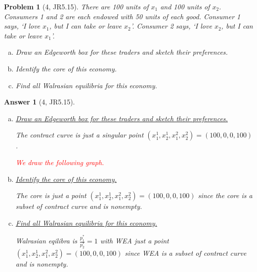 \documentclass{article}
\newtheorem*{ans}{Answer}
\newtheorem*{prob}{{\bf Problem}}
\newcommand{\1}{{\bf 1}}
\newcommand{\0}{{\mathbf{0}}}
\newcommand{\<}{\langle}
\renewcommand{\>}{\rangle}
\begin{document}
\begin{prob}[4, JR5.15]There are 100 units of $x_1$ and 100 units of $x_2$. Consumers 1 and 2 are each endowed with 50 units of each good. Consumer 1 says, ‘I love $x_1$, but I can take or leave $x_2$’. Consumer 2 says, ‘I love $x_2$, but I can take or leave $x_1$’.
\begin{enumerate}[(a)]
	\item Draw an Edgeworth box for these traders and sketch their preferences. 
\item  Identify the core of this economy. \item  Find all Walrasian equilibria for this economy.
\end{enumerate}
\end{prob}
\begin{ans}[4, JR5.15]
	
	\begin{enumerate}[(a)]
		\item \ul{Draw an Edgeworth box for these traders and sketch their preferences.}
		
		The contract curve is just a singular point $\left(x_1^1,x_2^1,x_1^2, x_2^2\right) = \left( 100, 0, 0, 100\right)$.
		
		\textcolor{red}{We draw the following graph.}
		\newpage 
		\item  \ul{Identify the core of this economy.} 
		
				The core is just a point $\left(x_1^1,x_2^1,x_1^2, x_2^2\right) = \left( 100, 0, 0, 100\right)$ since the core is a subset of contract curve and is nonempty.
		\item  \ul{Find all Walrasian equilibria for this economy.}
		
 Walrasian eqilibra is $\frac{p_1^*}{p_2^*} =1$ with WEA just a point $\left(x_1^1,x_2^1,x_1^2, x_2^2\right) = \left( 100, 0, 0, 100\right)$ since WEA is a subset of contract curve and is nonempty.
	\end{enumerate}
\end{ans}
\end{document}
